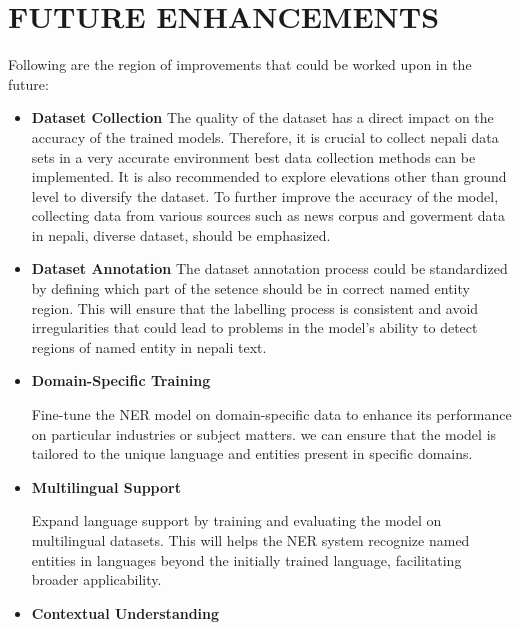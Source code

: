 \chapter{FUTURE ENHANCEMENTS}




Following are the region of improvements that could be worked upon in the future:
\begin{itemize}
    \item \textbf{Dataset Collection}
The quality of the dataset has a direct impact on the accuracy of the trained models. 
Therefore, it is crucial to collect nepali data sets in a very accurate environment best data collection methods can be implemented.
  It is also recommended to explore elevations other than 
ground level to diversify the dataset. To further improve the accuracy of the model, 
collecting data from various sources such as news corpus  and goverment data in nepali, diverse dataset, should be emphasized.
\item \textbf{Dataset Annotation}
The dataset annotation process could be standardized by defining which part of the setence should be in correct named entity region. This will ensure that the labelling process is consistent and avoid 
irregularities that could lead to problems in the model's ability to detect regions of 
named entity in nepali text.


\item \textbf{Domain-Specific Training}

Fine-tune the NER model on domain-specific data to enhance its performance on particular industries or subject matters. we can ensure that the model is tailored to the unique language and entities present in specific domains.
 
 
 \item \textbf{Multilingual Support}

Expand language support by training and evaluating the model on multilingual datasets. This will helps the NER system recognize named entities in languages beyond the initially trained language, facilitating broader applicability.

 
\item \textbf{Contextual Understanding}


\end{itemize}
